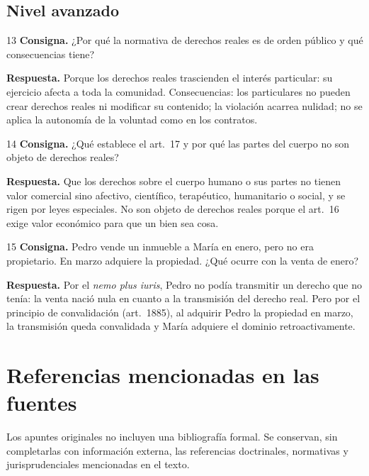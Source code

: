 \documentclass[12pt,oneside]{book}
\begin{document}
\section{Nivel avanzado}

\begin{ejercicio}{13}
\textbf{Consigna.} ¿Por qué la normativa de derechos reales es de orden público y qué consecuencias tiene?

\textbf{Respuesta.} Porque los derechos reales trascienden el interés particular: su ejercicio afecta a toda la comunidad. Consecuencias: los particulares no pueden crear derechos reales ni modificar su contenido; la violación acarrea nulidad; no se aplica la autonomía de la voluntad como en los contratos.
\end{ejercicio}

\begin{ejercicio}{14}
\textbf{Consigna.} ¿Qué establece el art.~17 y por qué las partes del cuerpo no son objeto de derechos reales?

\textbf{Respuesta.} Que los derechos sobre el cuerpo humano o sus partes no tienen valor comercial sino afectivo, científico, terapéutico, humanitario o social, y se rigen por leyes especiales. No son objeto de derechos reales porque el art.~16 exige valor económico para que un bien sea cosa.
\end{ejercicio}

\begin{ejercicio}{15}
\textbf{Consigna.} Pedro vende un inmueble a María en enero, pero no era propietario. En marzo adquiere la propiedad. ¿Qué ocurre con la venta de enero?

\textbf{Respuesta.} Por el \textit{nemo plus iuris}, Pedro no podía transmitir un derecho que no tenía: la venta nació nula en cuanto a la transmisión del derecho real. Pero por el principio de convalidación (art.~1885), al adquirir Pedro la propiedad en marzo, la transmisión queda convalidada y María adquiere el dominio retroactivamente.
\end{ejercicio}

\backmatter

\chapter*{Referencias mencionadas en las fuentes}

Los apuntes originales no incluyen una bibliografía formal. Se conservan, sin completarlas con información externa, las referencias doctrinales, normativas y jurisprudenciales mencionadas en el texto.
\end{document}
